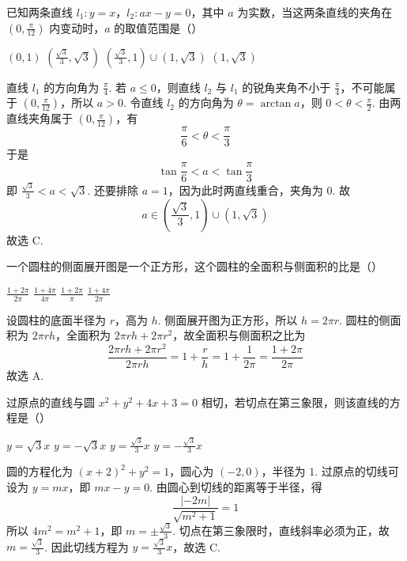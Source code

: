 \begin{problem}
已知两条直线 \(l_{1}:y=x\)，\(l_{2}:ax-y=0\)，其中 \(a\) 为实数，当这两条直线的夹角在 \(\left(0,\frac{\pi}{12}\right)\) 内变动时，\(a\) 的取值范围是（\quad）

\choices
    {\((0,1)\)}
    {\(\left(\frac{\sqrt{3}}{3},\sqrt{3}\right)\)}
    {\(\left(\frac{\sqrt{3}}{3},1\right)\cup(1,\sqrt{3})\)}
    {\((1,\sqrt{3})\)}


\begin{solution}
直线 \(l_1\) 的方向角为 \(\frac{\pi}{4}\). 若 \(a\leqslant0\)，则直线 \(l_2\) 与 \(l_1\) 的锐角夹角不小于 \(\frac{\pi}{4}\)，不可能属于 \(\left(0,\frac{\pi}{12}\right)\)，所以 \(a>0\). 令直线 \(l_2\) 的方向角为 \(\theta=\arctan a\)，则 \(0<\theta<\frac{\pi}{2}\). 由两直线夹角属于 \(\left(0,\frac{\pi}{12}\right)\)，有
\[
\frac{\pi}{6}<\theta<\frac{\pi}{3}
\]
于是
\[
\tan\frac{\pi}{6}<a<\tan\frac{\pi}{3}
\]
即 \(\frac{\sqrt3}{3}<a<\sqrt3\). 还要排除 \(a=1\)，因为此时两直线重合，夹角为 \(0\). 故
\[
a\in\left(\frac{\sqrt3}{3},1\right)\cup(1,\sqrt3)
\]
故选 C.
\end{solution}
\end{problem}

\begin{problem}
一个圆柱的侧面展开图是一个正方形，这个圆柱的全面积与侧面积的比是（\quad）

\choices
    {\(\frac{1+2\pi}{2\pi}\)}
    {\(\frac{1+4\pi}{4\pi}\)}
    {\(\frac{1+2\pi}{\pi}\)}
    {\(\frac{1+4\pi}{2\pi}\)}


\begin{solution}
设圆柱的底面半径为 \(r\)，高为 \(h\). 侧面展开图为正方形，所以 \(h=2\pi r\). 圆柱的侧面积为 \(2\pi rh\)，全面积为 \(2\pi rh+2\pi r^2\)，故全面积与侧面积之比为
\[
\frac{2\pi rh+2\pi r^2}{2\pi rh}=1+\frac{r}{h}=1+\frac{1}{2\pi}=\frac{1+2\pi}{2\pi}
\]
故选 A.
\end{solution}
\end{problem}

\begin{problem}
过原点的直线与圆 \(x^{2}+y^{2}+4x+3=0\) 相切，若切点在第三象限，则该直线的方程是（\quad）

\choices
    {\(y=\sqrt{3}x\)}
    {\(y=-\sqrt{3}x\)}
    {\(y=\frac{\sqrt{3}}{3}x\)}
    {\(y=-\frac{\sqrt{3}}{3}x\)}


\begin{solution}
圆的方程化为 \((x+2)^2+y^2=1\)，圆心为 \((-2,0)\)，半径为 \(1\). 过原点的切线可设为 \(y=mx\)，即 \(mx-y=0\). 由圆心到切线的距离等于半径，得
\[
\frac{|{-2m}|}{\sqrt{m^2+1}}=1
\]
所以 \(4m^2=m^2+1\)，即 \(m=\pm\frac{\sqrt3}{3}\). 切点在第三象限时，直线斜率必须为正，故 \(m=\frac{\sqrt3}{3}\). 因此切线方程为 \(y=\frac{\sqrt3}{3}x\)，故选 C.
\end{solution}
\end{problem}

